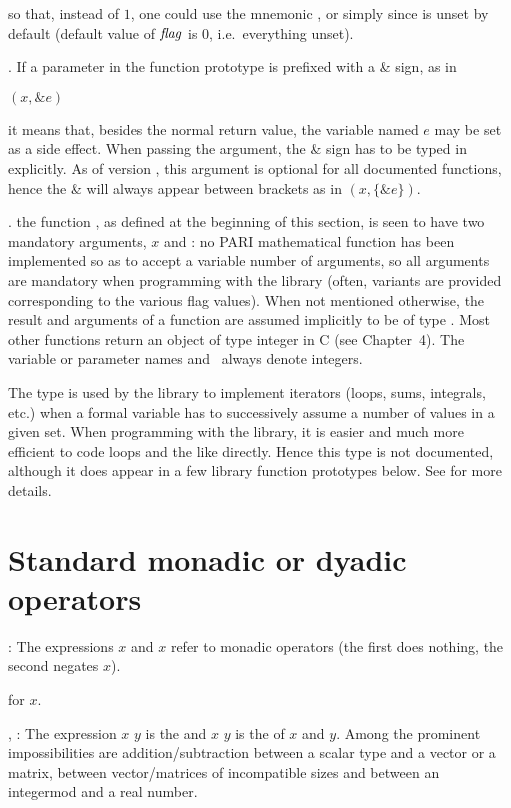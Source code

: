 \noindent so that, instead of $1$, one could use the mnemonic
, or simply  since
 is unset by default (default value of $\hbox{\it f\kern0pt lag\/}$ is $0$,
i.e.~everything unset).

. If a parameter in the function
prototype is prefixed with a \& sign, as in

$(x,\&e)$

\noindent it means that, besides the normal return value, the variable named
$e$ may be set as a side effect. When passing the argument, the \& sign has
to be typed in explicitly. As of version \vers, this  argument
is optional for all documented functions, hence the \& will always appear
between brackets as in $(x,\{\&e\})$.

.
the  function , as defined
at the beginning of this section, is seen to have two mandatory arguments,
$x$ and \fl: no PARI mathematical function has been implemented so as to
accept a variable number of arguments, so all arguments are mandatory when
programming with the library (often, variants are provided corresponding to
the various flag values). When not mentioned otherwise, the result and
arguments of a function are assumed implicitly to be of type . Most
other functions return an object of type  integer in C (see
Chapter~4). The variable or parameter names  and \fl\ always denote
 integers.

The  type is used by the library to implement iterators (loops,
sums, integrals, etc.) when a formal variable has to successively assume a
number of values in a given set. When programming with the library, it is
easier and much more efficient to code loops and the like directly. Hence
this type is not documented, although it does appear in a few library
function prototypes below. See  for more details.

\section{Standard monadic or dyadic operators}

\subseckbd{+$/$-}: The expressions \kbd{+}$x$ and \kbd{-}$x$ refer
to monadic operators (the first does nothing, the second negates $x$).

 for \kbd{-}$x$.

\subseckbd{+}, \kbd{-}: The expression $x$ \kbd{+} $y$ is the  and
$x$ \kbd{-} $y$ is the  of $x$ and $y$. Among the prominent
impossibilities are addition/subtraction between a scalar type and a vector
or a matrix, between vector/matrices of incompatible sizes and between an
integermod and a real number.

